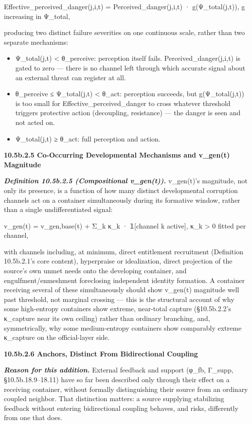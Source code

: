 \documentclass[
]{article}
\begin{document}
Effective\_perceived\_danger(j,i,t) = Perceived\_danger(j,i,t) ·
g(Ψ\_total(j,t)), g increasing in Ψ\_total,

producing two distinct failure severities on one continuous scale,
rather than two separate mechanisms:

\begin{itemize}
\item
  Ψ\_total(j,t) \textless{} θ\_perceive: perception itself fails.
  Perceived\_danger(j,i,t) is gated to zero --- there is no channel left
  through which accurate signal about an external threat can register at
  all.
\item
  θ\_perceive ≤ Ψ\_total(j,t) \textless{} θ\_act: perception succeeds,
  but g(Ψ\_total(j,t)) is too small for Effective\_perceived\_danger to
  cross whatever threshold triggers protective action (decoupling,
  resistance) --- the danger is seen and not acted on.
\item
  Ψ\_total(j,t) ≥ θ\_act: full perception and action.
\end{itemize}

\textbf{10.5b.2.5 Co-Occurring Developmental Mechanisms and v\_gen(t)
Magnitude}

\emph{\textbf{Definition 10.5b.2.5 (Compositional v\_gen(t)).}}
v\_gen(t)'s magnitude, not only its presence, is a function of how many
distinct developmental corruption channels act on a container
simultaneously during its formative window, rather than a single
undifferentiated signal:

v\_gen(t) = v\_gen,base(t) + Σ\_k κ\_k · 𝟙{[}channel k active{]}, κ\_k
\textgreater{} 0 fitted per channel,

with channels including, at minimum, direct entitlement recruitment
(Definition 10.5b.2.1's core content), hyperpraise or idealization,
direct projection of the source's own unmet needs onto the developing
container, and engulfment/enmeshment foreclosing independent identity
formation. A container receiving several of these simultaneously should
show v\_gen(t) magnitude well past threshold, not marginal crossing ---
this is the structural account of why some high-entropy containers show
extreme, near-total capture (§10.5b.2.2's κ\_capture near its own
ceiling) rather than ordinary branching, and, symmetrically, why some
medium-entropy containers show comparably extreme κ\_capture on the
official-layer side.

\textbf{10.5b.2.6 Anchors, Distinct From Bidirectional Coupling}

\emph{\textbf{Reason for this addition.}} External feedback and support
(φ\_fb, Γ\_supp, §10.5b.18.9--18.11) have so far been described only
through their effect on a receiving container, without formally
distinguishing their source from an ordinary coupled neighbor. That
distinction matters: a source supplying stabilizing feedback without
entering bidirectional coupling behaves, and risks, differently from one
that does.
\end{document}
